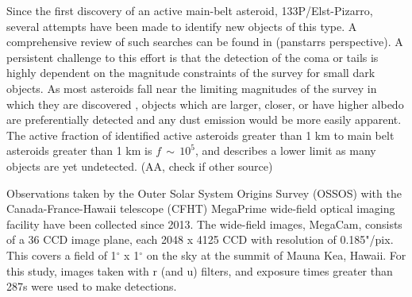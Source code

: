 \documentclass[iop,apj]{emulateapj}
\begin{document}
Since the first discovery of an active main-belt asteroid, 133P/Elst-Pizarro, several attempts have been made to identify new objects of this type. A comprehensive review of such searches can be found in \citet{hsieh2015}(panstarrs perspective).  A persistent challenge to this effort is that the detection of the coma or tails is highly dependent on the magnitude constraints of the survey for small dark objects. As most asteroids fall near the limiting magnitudes of the survey in which they are discovered \cite{jewitt15}, objects which are larger, closer, or have higher albedo are preferentially detected and any dust emission would be more easily apparent. The active fraction of identified active asteroids greater than 1 km to main belt asteroids greater than 1 km is $f \, \sim \, 10^5$, and describes a lower limit as many objects are yet undetected. \cite{jewitt15}(AA, check if other source) %



Observations taken by the Outer Solar System Origins Survey (OSSOS) with the Canada-France-Hawaii telescope (CFHT) MegaPrime wide-field optical imaging facility have been collected since 2013. The wide-field images, MegaCam, consists of a 36 CCD image plane, each 2048 x 4125 CCD with resolution of 0.185"/pix. This covers a field of  1$^{\circ}$ x 1$^{\circ}$ on the sky at the summit of Mauna Kea, Hawaii. For this study, images taken with r (and u) filters, and exposure times greater than 287s were used to make detections.









\end{document}
